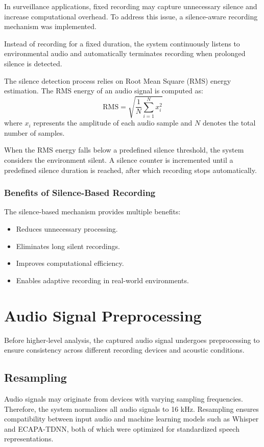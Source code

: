 \documentclass[12pt]{report}
\begin{document}
In surveillance applications, fixed recording may capture unnecessary silence and increase computational overhead. To address this issue, a silence-aware recording mechanism was implemented.

Instead of recording for a fixed duration, the system continuously listens to environmental audio and automatically terminates recording when prolonged silence is detected.

The silence detection process relies on Root Mean Square (RMS) energy estimation. The RMS energy of an audio signal is computed as:
\[
\text{RMS} = \sqrt{\frac{1}{N} \sum_{i=1}^{N} x_i^2}
\]
where $x_i$ represents the amplitude of each audio sample and $N$ denotes the total number of samples.

When the RMS energy falls below a predefined silence threshold, the system considers the environment silent. A silence counter is incremented until a predefined silence duration is reached, after which recording stops automatically.

\subsubsection{Benefits of Silence-Based Recording}
The silence-based mechanism provides multiple benefits:
\begin{itemize}
    \item Reduces unnecessary processing.
    \item Eliminates long silent recordings.
    \item Improves computational efficiency.
    \item Enables adaptive recording in real-world environments.
\end{itemize}

\section{Audio Signal Preprocessing}

Before higher-level analysis, the captured audio signal undergoes preprocessing to ensure consistency across different recording devices and acoustic conditions.

\subsection{Resampling}

Audio signals may originate from devices with varying sampling frequencies. Therefore, the system normalizes all audio signals to 16 kHz. Resampling ensures compatibility between input audio and machine learning models such as Whisper and ECAPA-TDNN, both of which were optimized for standardized speech representations.
\end{document}
